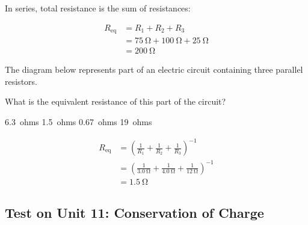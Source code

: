 \documentclass[]{exam}
\begin{document}
\begin{questions}
\begin{solution}
In series, total resistance is the sum of resistances:

\begin{align*}
    R_\mathrm{eq} &= R_1 + R_2 + R_3 \\[1ex]
    &= \SI{75}{\ohm} + \SI{100}{\ohm} + \SI{25}{\ohm} \\[1ex]
    &= \boxed{\SI{200}{\ohm}}
\end{align*}
\end{solution}

\question
The diagram below represents part of an electric circuit containing three parallel resistors.

\begin{center}
\end{center}


What is the equivalent resistance of this part of the circuit?

\begin{randomizechoices}
    \choice \SI{6.3}{ohms}
    \correctchoice \SI{1.5}{ohms}
    \choice \SI{0.67}{ohms}
    \choice \SI{19}{ohms}
\end{randomizechoices}

\begin{solution}
\begin{align*}
    R_\mathrm{eq} &= \left(\frac{1}{R_1} + \frac{1}{R_2} + \frac{1}{R_3}\right)^{-1} \\[1ex]
    &= \left(\frac{1}{\SI{3.0}{\ohm}} + \frac{1}{\SI{4.0}{\ohm}} + \frac{1}{\SI{12}{\ohm}}\right)^{-1} \\[1ex]
    &= \boxed{\SI{1.5}{\ohm}}
\end{align*}
\end{solution}

\clearpage

\ifprintanswers
{\Large
\printkeytable
}
\fi

\end{questions}

\clearpage

\subsection*{Test on Unit 11: Conservation of Charge}
\end{document}

